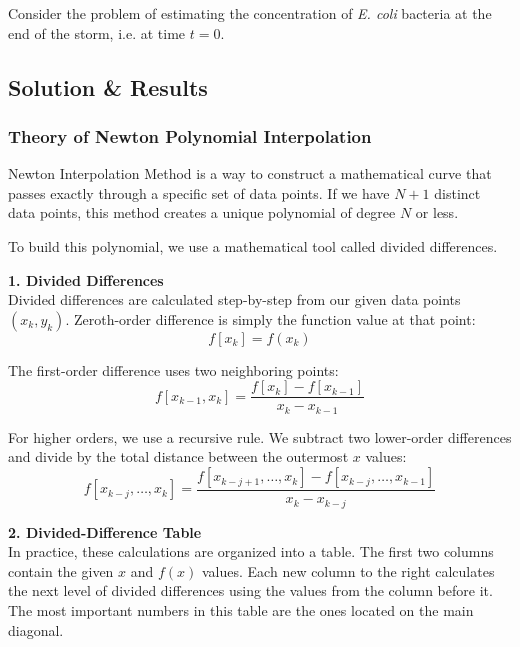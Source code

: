 \documentclass{article}
\begin{document}
Consider the problem of estimating the concentration of \textit{E. coli} bacteria at the end of the storm, i.e. at time $t = 0$.  

\subsection{Solution \& Results}

\subsubsection{Theory of Newton Polynomial Interpolation}

Newton Interpolation Method is a way to construct a mathematical curve that passes exactly through a specific set of data points. If we have $N + 1$ distinct data points, this method creates a unique polynomial of degree $N$ or less.

To build this polynomial, we use a mathematical tool called divided differences.

\vspace{5pt}
\noindent \textbf{1. Divided Differences} \cite[page 223]{MathewsFink2003} \\
Divided differences are calculated step-by-step from our given data points $(x_k, y_k)$.
Zeroth-order difference is simply the function value at that point:
\begin{equation*}
    f[x_k] = f(x_k)
\end{equation*}

The first-order difference uses two neighboring points:
\begin{equation*}
    f[x_{k-1}, x_k] = \frac{f[x_k] - f[x_{k-1}]}{x_k - x_{k-1}}
\end{equation*}

For higher orders, we use a recursive rule. We subtract two lower-order differences and divide by the total distance between the outermost $x$ values:
\begin{equation*}
    f[x_{k-j}, \dots, x_k] = \frac{f[x_{k-j+1}, \dots, x_k] - f[x_{k-j}, \dots, x_{k-1}]}{x_k - x_{k-j}}
\end{equation*}

\vspace{5pt}
\noindent \textbf{2. Divided-Difference Table} \cite[page 224]{MathewsFink2003} \\
In practice, these calculations are organized into a table. The first two columns contain the given $x$ and $f(x)$ values. Each new column to the right calculates the next level of divided differences using the values from the column before it. The most important numbers in this table are the ones located on the main diagonal.
\end{document}
